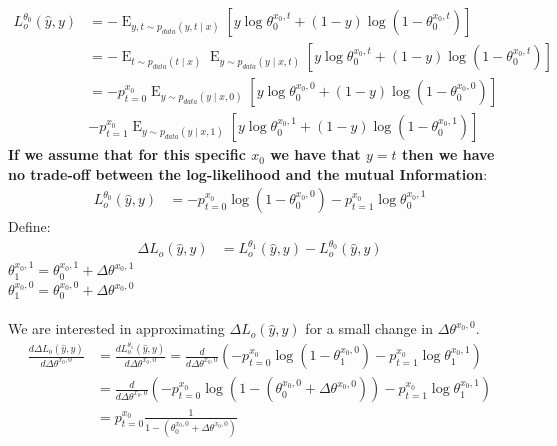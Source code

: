 \documentclass[oneside,12pt]{article}
\begin{document}
\begin{equation}
    \begin{split}
        L^{\theta_0}_o(\hat{y}, y) &= -\operatorname{E}_{y,t \sim p_{data}(y,t \mid x)}\left[y \operatorname{log}\theta_0^{x_0,t} + (1-y)\operatorname{log}(1-\theta_0^{x_0,t})\right]\\
        &= -\operatorname{E}_{t \sim p_{data}(t \mid x)} \operatorname{E}_{y \sim p_{data}(y \mid x,t)}\left[y \operatorname{log}\theta_0^{x_0,t} + (1-y)\operatorname{log}(1-\theta_0^{x_0,t})\right]\\
        &= -p^{x_0}_{t=0} \operatorname{E}_{y \sim p_{data}(y \mid x,0)}\left[y \operatorname{log}\theta_0^{x_0,0} + (1-y)\operatorname{log}(1-\theta_0^{x_0,0})\right]\\
        &- p^{x_0}_{t=1} \operatorname{E}_{y \sim p_{data}(y \mid x,1)}\left[y \operatorname{log}\theta_0^{x_0,1} + (1-y)\operatorname{log}(1-\theta_0^{x_0,1})\right]
    \end{split}
\end{equation}
%
\textbf{If we assume that for this specific $x_0$ we have that $y=t$ then we have no trade-off between the log-likelihood and the mutual Information}:
%
\begin{equation}
    \begin{split}
        L^{\theta_0}_o(\hat{y}, y) &= -p^{x_0}_{t=0} \operatorname{log}(1-\theta_0^{x_0,0})- p^{x_0}_{t=1} \operatorname{log}\theta_0^{x_0,1}
    \end{split}
\end{equation}
%
Define:
%
\begin{equation}
    \begin{split}
        \Delta L_o(\hat{y}, y) &= L^{\theta_1}_o(\hat{y}, y) - L^{\theta_0}_o(\hat{y}, y)
    \end{split}
\end{equation}
%
$\theta_1^{x_0,1} = \theta_0^{x_0,1} + \Delta\theta^{x_0,1}$\\
$\theta_1^{x_0,0} = \theta_0^{x_0,0} + \Delta\theta^{x_0,0}$\\\\
%
We are interested in approximating $\Delta L_o(\hat{y}, y)$ for a small change in $\Delta\theta^{x_0,0}$.
%
\begin{equation}
    \begin{split}
        \frac{d\Delta L_o(\hat{y}, y)}{d\Delta\theta^{x_0,0}} &= \frac{dL^{\theta_1}_o(\hat{y}, y)}{d\Delta\theta^{x_0,0}} = \frac{d}{d\Delta\theta^{x_0,0}}\left(-p^{x_0}_{t=0} \operatorname{log}(1-\theta_1^{x_0,0})- p^{x_0}_{t=1} \operatorname{log}\theta_1^{x_0,1}\right)\\
        &= \frac{d}{d\Delta\theta^{x_0,0}}\left(-p^{x_0}_{t=0} \operatorname{log}(1-(\theta_0^{x_0,0} + \Delta\theta^{x_0,0}))- p^{x_0}_{t=1} \operatorname{log}\theta_1^{x_0,1}\right)\\
        &= p^{x_0}_{t=0} \frac{1}{1-(\theta_0^{x_0,0} + \Delta\theta^{x_0,0})}
    \end{split}
\end{equation}
\end{document}
